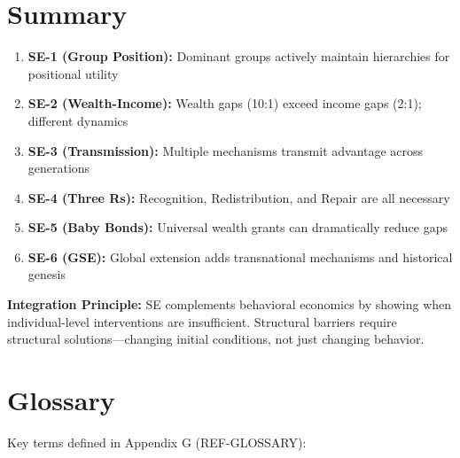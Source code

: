 \section{Summary}
\label{sec:se-summary}

\begin{tcolorbox}[colback=blue!5!white,colframe=blue!75!black,title=Key Takeaways]
\begin{enumerate}
    \item \textbf{SE-1 (Group Position):} Dominant groups actively maintain hierarchies for positional utility
    \item \textbf{SE-2 (Wealth-Income):} Wealth gaps (10:1) exceed income gaps (2:1); different dynamics
    \item \textbf{SE-3 (Transmission):} Multiple mechanisms transmit advantage across generations
    \item \textbf{SE-4 (Three Rs):} Recognition, Redistribution, and Repair are all necessary
    \item \textbf{SE-5 (Baby Bonds):} Universal wealth grants can dramatically reduce gaps
    \item \textbf{SE-6 (GSE):} Global extension adds transnational mechanisms and historical genesis
\end{enumerate}

\textbf{Integration Principle:} SE complements behavioral economics by showing when individual-level interventions are insufficient. Structural barriers require structural solutions---changing initial conditions, not just changing behavior.
\end{tcolorbox}

\section{Glossary}
\label{sec:se-glossary}

Key terms defined in Appendix G (REF-GLOSSARY):

